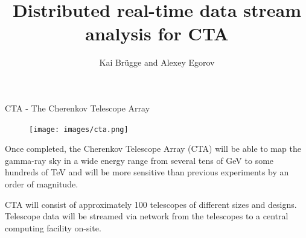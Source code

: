 

\title{Distributed real-time data stream analysis for CTA}
\author{Kai Brügge and Alexey Egorov}
\usetikzlibrary{calc}
\usetikzlibrary{shadows.blur}

%

\begin{multicols}{2}
    \begin{block}[]{CTA - The Cherenkov Telescope Array}%
      \begin{multicols}{2}
        \begin{figure}
          \texttt{[image: images/cta.png]}\\
        \end{figure}
        \columnbreak
        Once completed, the  Cherenkov Telescope Array (CTA)  will be able to map the gamma-ray sky
        in a wide energy range from several tens of GeV to some hundreds of TeV and will be more sensitive
        than previous experiments by an order of magnitude.

        CTA will consist of approximately 100 telescopes of different sizes and designs.
        Telescope data will be streamed via network from the telescopes to a central computing facility
        on-site.
      \end{multicols}
    \end{block}%


\end{multicols}
